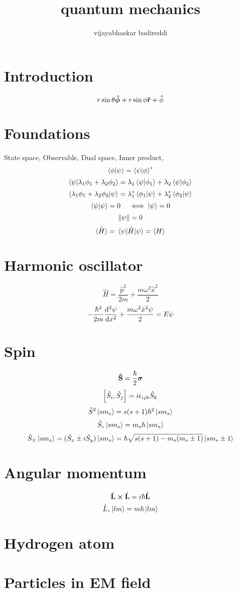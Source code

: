 \documentclass[12pt]{article}
\title{quantum mechanics}
\author{vijayabhaskar badireddi}
\date{}
\begin{document}

\section*{Introduction}
\[r\sin\theta\boldsymbol{\hat{\phi}}+r\sin\phi\vu{r}+\vu{\phi}\]
\section*{Foundations}
State space, Observable, Dual space, Inner product,
\[\braket{\phi}{\psi}=\braket{\psi}{\phi}^*\]
\[\braket{\psi}{\lambda_1\phi_1+\lambda_2\phi_2}=\lambda_1\braket{\psi}{\phi_1}+\lambda_2\braket{\psi}{\phi_2}\]
\[\braket{\lambda_1\phi_1+\lambda_2\phi_2}{\psi}=\lambda_1^*\braket{\phi_1}{\psi}+\lambda_2^*\braket{\phi_2}{\psi}\]
\[\braket{\psi}{\psi}= 0 \quad \iff \ket{\psi}=0 \]
\[\norm{\psi}=0\]
\[\hat{\ev{H}}=\mel{\psi}{\hat{H}}{\psi}=\ev{H}\]
\section*{Harmonic oscillator}
\[\hat{H}=\frac{\hat{p}^2}{2m}+\frac{m\omega^2\hat{x}^2}{2}\]
\[-\frac{\hbar^2}{2m}\dv[2]{\psi}{x}+\frac{m\omega^2\hat{x}^2\psi}{2}=E\psi\]
\section*{Spin}
\[\vu{S}=\frac{\hbar}{2}\boldsymbol{\sigma}\]
\[\comm{\hat{S}_i}{\hat{S}_j}=i\epsilon_{ijk}\hat{S}_k\]
\[\hat{S}^2\ket{sm_s}=s(s+1)\hbar^2\ket{sm_s}\]
\[\hat{S}_z\ket{sm_s}=m_s\hbar\ket{sm_s}\]
\[\hat{S}_{\pm}\ket{sm_s}=(\hat{S}_{x}\pm i\hat{S}_y)\ket{sm_s}=\hbar\sqrt{s(s+1)-m_s(m_s\pm1)}\ket{sm_s\pm1}\]
\section*{Angular momentum}
\[\hat{\vb{L}}\cp\hat{\vb{L}}=i\hbar\hat{\vb{L}}\]
\[\hat{L}_z\ket{lm}=m\hbar\ket{lm}\]

\section*{Hydrogen atom}
\section*{Particles in EM field}
\end{document}
